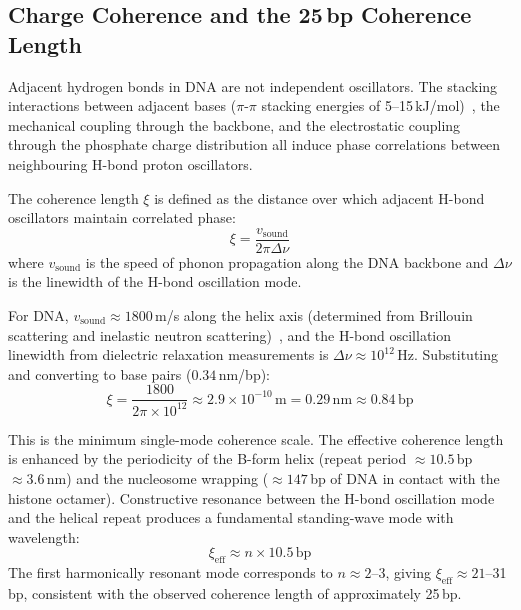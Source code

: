 \documentclass[12pt,a4paper]{article}
\theoremstyle{definition}
\theoremstyle{remark}
\begin{document}
\subsection{Charge Coherence and the 25\,bp Coherence Length}

Adjacent hydrogen bonds in DNA are not independent oscillators. The stacking interactions between adjacent bases ($\pi$-$\pi$ stacking energies of 5--15\,kJ/mol)~\cite{Sinnokrot2004,Sponer2006}, the mechanical coupling through the backbone, and the electrostatic coupling through the phosphate charge distribution all induce phase correlations between neighbouring H-bond proton oscillators.

The coherence length $\xi$ is defined as the distance over which adjacent H-bond oscillators maintain correlated phase:
\begin{equation}
  \xi = \frac{v_{\mathrm{sound}}}{2\pi \Delta\nu}
  \label{eq:coherence_length}
\end{equation}
where $v_{\mathrm{sound}}$ is the speed of phonon propagation along the DNA backbone and $\Delta\nu$ is the linewidth of the H-bond oscillation mode.

For DNA, $v_{\mathrm{sound}} \approx 1800$\,m/s along the helix axis (determined from Brillouin scattering and inelastic neutron scattering)~\cite{Grimm2001,Weidlich1990}, and the H-bond oscillation linewidth from dielectric relaxation measurements is $\Delta\nu \approx 10^{12}$\,Hz. Substituting and converting to base pairs ($0.34$\,nm/bp):
\begin{equation}
  \xi = \frac{1800}{2\pi \times 10^{12}} \approx 2.9 \times 10^{-10}\,\mathrm{m} = 0.29\,\mathrm{nm} \approx 0.84\,\mathrm{bp}
\end{equation}

This is the minimum single-mode coherence scale. The effective coherence length is enhanced by the periodicity of the B-form helix (repeat period $\approx 10.5$\,bp $\approx 3.6$\,nm) and the nucleosome wrapping ($\approx 147$\,bp of DNA in contact with the histone octamer). Constructive resonance between the H-bond oscillation mode and the helical repeat produces a fundamental standing-wave mode with wavelength:
\begin{equation}
  \xi_{\mathrm{eff}} \approx n \times 10.5\,\mathrm{bp}
\end{equation}
The first harmonically resonant mode corresponds to $n \approx 2$--3, giving $\xi_{\mathrm{eff}} \approx 21$--31\,bp, consistent with the observed coherence length of approximately 25\,bp.
\end{document}
